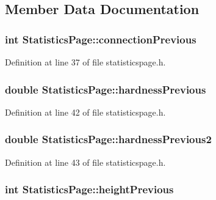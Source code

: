 \subsection{Member Data Documentation}
\hypertarget{class_statistics_page_ad87b2ecc9e6d3c1575627fe189ce61f8}{}
\subsubsection[{connection\+Previous}]{\setlength{\rightskip}{0pt plus 5cm}int Statistics\+Page\+::connection\+Previous}\label{class_statistics_page_ad87b2ecc9e6d3c1575627fe189ce61f8}


Definition at line 37 of file statisticspage.\+h.

\hypertarget{class_statistics_page_a26dc0dffb8caecf22d3d741704768bd0}{}
\subsubsection[{hardness\+Previous}]{\setlength{\rightskip}{0pt plus 5cm}double Statistics\+Page\+::hardness\+Previous}\label{class_statistics_page_a26dc0dffb8caecf22d3d741704768bd0}


Definition at line 42 of file statisticspage.\+h.

\hypertarget{class_statistics_page_a84beb1c9bfa4fa40fd0a05c68d026ffd}{}
\subsubsection[{hardness\+Previous2}]{\setlength{\rightskip}{0pt plus 5cm}double Statistics\+Page\+::hardness\+Previous2}\label{class_statistics_page_a84beb1c9bfa4fa40fd0a05c68d026ffd}


Definition at line 43 of file statisticspage.\+h.

\hypertarget{class_statistics_page_a84569b20c6a5f1e5970c9ec28fce6a94}{}
\subsubsection[{height\+Previous}]{\setlength{\rightskip}{0pt plus 5cm}int Statistics\+Page\+::height\+Previous}\label{class_statistics_page_a84569b20c6a5f1e5970c9ec28fce6a94}


